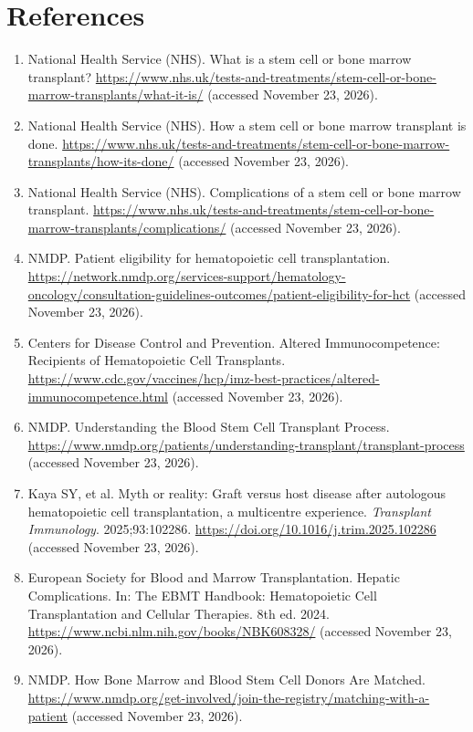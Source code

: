 \section*{References}
\begin{enumerate}
  \item National Health Service (NHS). What is a stem cell or bone marrow transplant? \url{https://www.nhs.uk/tests-and-treatments/stem-cell-or-bone-marrow-transplants/what-it-is/} (accessed November 23, 2026).
  \item National Health Service (NHS). How a stem cell or bone marrow transplant is done. \url{https://www.nhs.uk/tests-and-treatments/stem-cell-or-bone-marrow-transplants/how-its-done/} (accessed November 23, 2026).
  \item National Health Service (NHS). Complications of a stem cell or bone marrow transplant. \url{https://www.nhs.uk/tests-and-treatments/stem-cell-or-bone-marrow-transplants/complications/} (accessed November 23, 2026).
  \item NMDP. Patient eligibility for hematopoietic cell transplantation. \url{https://network.nmdp.org/services-support/hematology-oncology/consultation-guidelines-outcomes/patient-eligibility-for-hct} (accessed November 23, 2026).
  \item Centers for Disease Control and Prevention. Altered Immunocompetence: Recipients of Hematopoietic Cell Transplants. \url{https://www.cdc.gov/vaccines/hcp/imz-best-practices/altered-immunocompetence.html} (accessed November 23, 2026).
  \item NMDP. Understanding the Blood Stem Cell Transplant Process. \url{https://www.nmdp.org/patients/understanding-transplant/transplant-process} (accessed November 23, 2026).
  \item Kaya SY, et al. Myth or reality: Graft versus host disease after autologous hematopoietic cell transplantation, a multicentre experience. \textit{Transplant Immunology}. 2025;93:102286. \url{https://doi.org/10.1016/j.trim.2025.102286} (accessed November 23, 2026).
  \item European Society for Blood and Marrow Transplantation. Hepatic Complications. In: The EBMT Handbook: Hematopoietic Cell Transplantation and Cellular Therapies. 8th ed. 2024. \url{https://www.ncbi.nlm.nih.gov/books/NBK608328/} (accessed November 23, 2026).
  \item NMDP. How Bone Marrow and Blood Stem Cell Donors Are Matched. \url{https://www.nmdp.org/get-involved/join-the-registry/matching-with-a-patient} (accessed November 23, 2026).
\end{enumerate}

\clearpage
